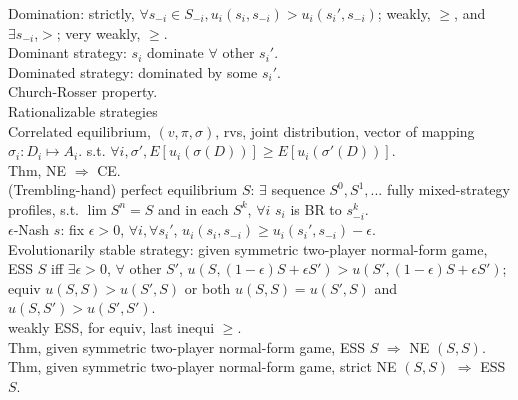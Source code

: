 \documentclass[paper=a4, fontsize=11pt]{scrartcl} %
\numberwithin{equation}{section} %
\numberwithin{figure}{section} %
\numberwithin{table}{section} %
\begin{document}
Domination: strictly, $\forall s_{-i}\in S_{-i}, u_i(s_i,s_{-i})>u_i(s_i',s_{-i})$; weakly, $\geq$, and $\exists s_{-i}$,$>$; very weakly, $\geq$.\\
Dominant strategy: $s_i$ dominate $\forall$ other $s_i'$.\\
Dominated strategy: dominated by some $s_i'$.\\
Church-Rosser property.\\
Rationalizable strategies\\
Correlated equilibrium, $(v,\pi,\sigma)$, rvs, joint distribution, vector of mapping $\sigma_i:D_i\mapsto A_i$. s.t. $\forall i,\sigma', E[u_i(\sigma(D))] \geq E[u_i(\sigma'(D))]$.\\
Thm, NE $\Rightarrow$ CE.\\
(Trembling-hand) perfect equilibrium $S$: $\exists$ sequence $S^0,S^1,...$ fully mixed-strategy profiles, s.t. $\lim S^n = S$ and in each $S^k$, $\forall i$ $s_i$ is BR to $s_{-i}^k$.\\
$\epsilon$-Nash $s$: fix $\epsilon>0$, $\forall i,\forall s_i'$, $u_i(s_i,s_{-i})\geq u_i(s_i',s_{-i}) - \epsilon$.\\
Evolutionarily stable strategy: given symmetric two-player normal-form game, ESS $S$ iff $\exists\epsilon>0$, $\forall$ other $S'$, $u(S,(1-\epsilon)S+\epsilon S')>u(S',(1-\epsilon)S+\epsilon S')$; equiv $u(S,S)>u(S',S)$ or both $u(S,S)=u(S',S)$ and $u(S,S')>u(S',S')$.\\
weakly ESS, for equiv, last inequi $\geq$.\\
Thm, given symmetric two-player normal-form game, ESS $S$ $\Rightarrow$ NE $(S,S)$.\\
Thm, given symmetric two-player normal-form game, strict NE $(S,S)$ $\Rightarrow$ ESS $S$.\\
\end{document}
